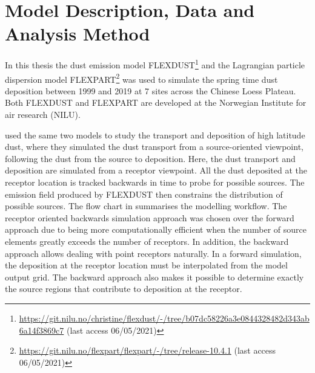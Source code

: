 \chapter{Model Description, Data and Analysis Method} 
In this thesis the dust emission model 
FLEXDUST\footnote{\url{https://git.nilu.no/christine/flexdust/-/tree/b07dc58226a3e0844328482d343ab6a14f3869c7} (last access 06/05/2021)} 
\parencite{flexdust_ref_2016} and the Lagrangian particle dispersion model 
FLEXPART\footnote{ \url{https://git.nilu.no/flexpart/flexpart/-/tree/release-10.4.1} (last access 06/05/2021)} 
\parencite{Flexpart10.4_ref} was used to 
simulate the spring time dust deposition between 1999 and 2019 at 7 sites across the Chinese Loess Plateau. Both FLEXDUST and FLEXPART are developed at the Norwegian Institute for air research (NILU). 

\textcite{flexdust_ref_2016} used the same two models to study the transport and deposition of high latitude dust, where they simulated the dust transport from a source-oriented viewpoint, following the dust from the source to deposition. Here, the dust transport and deposition are simulated from a receptor viewpoint. All the dust deposited at the receptor location is tracked backwards in time to probe for possible sources. The emission field produced by FLEXDUST then constrains the distribution of possible sources. The flow chart in  summarises the modelling workflow. The receptor oriented backwards simulation approach was chosen over the forward approach due to being more computationally efficient when the number of source elements greatly exceeds the number of receptors. In addition, the backward approach allows dealing with point receptors naturally. In a forward simulation, the deposition at the receptor location must be interpolated from the model output grid. The backward approach also makes it possible to determine exactly the source regions that contribute to deposition at the receptor. 

